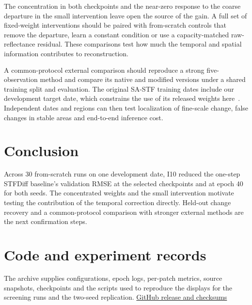 \documentclass[a4paper,10pt,twocolumn]{article}
\begin{document}
The concentration in both checkpoints and the near-zero response to the coarse departure in the small intervention leave open the source of the gain. A full set of fixed-weight interventions should be paired with from-scratch controls that remove the departure, learn a constant condition or use a capacity-matched raw-reflectance residual. These comparisons test how much the temporal and spatial information contributes to reconstruction.

A common-protocol external comparison should reproduce a strong five-observation method and compare its native and modified versions under a shared training split and evaluation. The original SA-STF training dates include our development target date, which constrains the use of its released weights here~\citep{zhang2026sastf}. Independent dates and regions can then test localization of fine-scale change, false changes in stable areas and end-to-end inference cost.

\section{Conclusion}
Across 30 from-scratch runs on one development date, I10 reduced the one-step STFDiff baseline's validation RMSE at the selected checkpoints and at epoch 40 for both seeds. The concentrated weights and the small intervention motivate testing the contribution of the temporal correction directly. Held-out change recovery and a common-protocol comparison with stronger external methods are the next confirmation steps.

\section*{Code and experiment records}
The archive supplies configurations, epoch logs, per-patch metrics, source snapshots, checkpoints and the scripts used to reproduce the displays for the screening runs and the two-seed replication. \href{https://github.com/qing1989620/paper-shikongyaogan/releases/tag/stf-stage-20261125}{GitHub release and checksums}

\FloatBarrier
\balance


\end{document}
